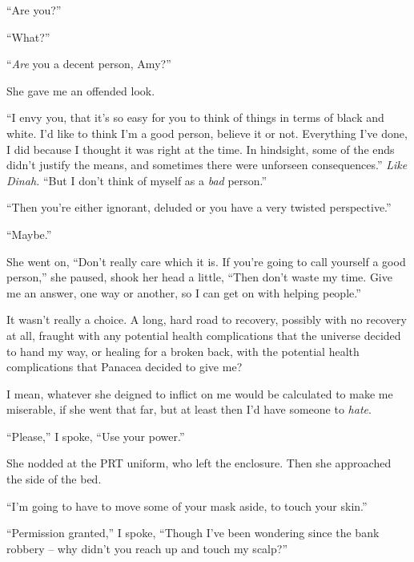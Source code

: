 ``Are you?''



``What?''



``\emph{Are} you a decent person, Amy?''



She gave me an offended look.



``I envy you, that it's so easy for you to think of things in terms of black and white.  I'd like to think I'm a good person, believe it or not.  Everything I've done, I did because I thought it was right at the time.  In hindsight, some of the ends didn't justify the means, and sometimes there were unforseen consequences.''  \emph{Like Dinah.}  ``But I don't think of myself as a \emph{bad} person.''



``Then you're either ignorant, deluded or you have a very twisted perspective.''



``Maybe.''



She went on, ``Don't really care which it is.  If you're going to call yourself a good person,'' she paused, shook her head a little, ``Then don't waste my time.  Give me an answer, one way or another, so I can get on with helping people.''



It wasn't really a choice.  A long, hard road to recovery, possibly with no recovery at all, fraught with any potential health complications that the universe decided to hand my way, or healing for a broken back, with the potential health complications that Panacea decided to give me?



I mean, whatever she deigned to inflict on me would be calculated to make me miserable, if she went that far, but at least then I'd have someone to \emph{hate}.



``Please,'' I spoke, ``Use your power.''



She nodded at the PRT uniform, who left the enclosure.  Then she approached the side of the bed.



``I'm going to have to move some of your mask aside, to touch your skin.''



``Permission granted,'' I spoke, ``Though I've been wondering since the bank robbery – why didn't you reach up and touch my scalp?''



